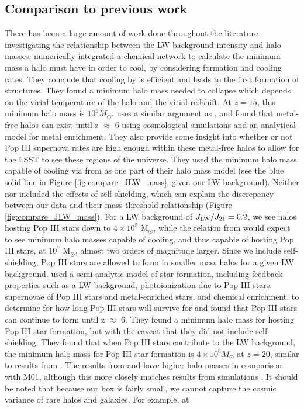 \documentclass[fleqn,usenatbib]{mnras}
\begin{document}
\subsection{Comparison to previous work}

There has been a large amount of work done throughout the literature investigating the relationship between the LW background intensity and halo masses. \citet{Tegmark97} numerically integrated a chemical network to calculate the minimum mass a halo must have in order to cool, by considering \hh{} formation and cooling rates. They conclude that cooling by \hh{} is efficient and leads to the first formation of structures. They found a minimum halo mass needed to collapse which depends on the virial temperature of the halo and the virial redshift. At $z = 15$, this minimum halo mass is $10^{6} M_{\odot}$. \citet{Trenti09} uses a similar argument as \citet{Tegmark97}, and found that metal-free halos can exist until z $\approx$ 6 using cosmological simulations and an analytical model for metal enrichment. They also provide some insight into whether or not Pop III supernova rates are high enough within these metal-free halos to allow for the LSST to see these regions of the universe. They used the minimum halo mass capable of cooling via \hh{} from \citet{Trenti09_SFR} as one part of their halo mass model (see the blue solid line in Figure \ref{fig:compare_JLW_mass}, given our LW background). Neither \citet{Trenti09} nor \citet{Tegmark97} included the effects of \hh{} self-shielding, which can explain the discrepancy between our data and their mass threshold relationship (Figure \ref{fig:compare_JLW_mass}). For a LW background of $J_{\rm LW} / J_{21} = 0.2$, we see halos hosting Pop III stars down to $4 \times 10^{5}$ M$_{\odot}$, while the relation from \citet{Trenti09_SFR} would expect to see minimum halo masses capable of cooling, and thus capable of hosting Pop III stars, at $10^7$ M$_{\odot}$, almost two orders of magnitude larger. Since we include \hh{} self-shielding, Pop III stars are allowed to form in smaller mass halos for a given LW background. \citet{Mebane18} used a semi-analytic model of star formation, including feedback properties such as a LW background, photoionization due to Pop III stars, supernovae of Pop III stars and metal-enriched stars, and chemical enrichment, to determine for how long Pop III stars will survive for and found that Pop III stars can continue to form until z $\approx$ 6. They found a minimum halo mass for hosting Pop III star formation, but with the caveat that they did not include \hh{} self-shielding. They found that when Pop III stars contribute to the LW background, the minimum halo mass for Pop III star formation is $4 \times 10^{6} M_{\odot}$ at $z = 20$, similar to results from \citet{Tegmark97}. The results from \citet{Trenti09} and \citet{Mebane18} have higher halo masses in comparison with M01, although this more closely matches results from simulations \citep[see][]{Wise07_UVB, OShea08}. It should be noted that because our box is fairly small, we cannot capture the cosmic variance of rare halos and galaxies. For example, at 
\end{document}
